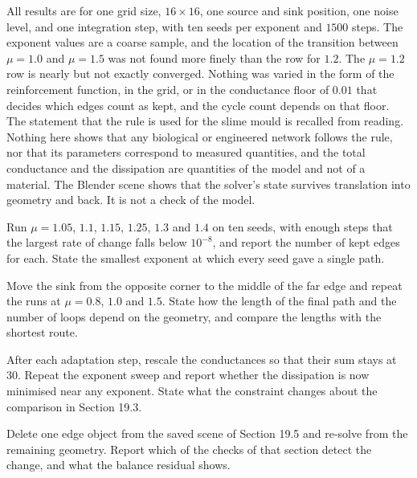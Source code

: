 All results are for one grid size, $16\times16$, one source and sink position, one noise level, and one integration step, with ten seeds per exponent and $1500$ steps. The exponent values are a coarse sample, and the location of the transition between $\mu=1.0$ and $\mu=1.5$ was not found more finely than the row for $1.2$. The $\mu=1.2$ row is nearly but not exactly converged. Nothing was varied in the form of the reinforcement function, in the grid, or in the conductance floor of $0.01$ that decides which edges count as kept, and the cycle count depends on that floor. The statement that the rule is used for the slime mould is recalled from reading. Nothing here shows that any biological or engineered network follows the rule, nor that its parameters correspond to measured quantities, and the total conductance and the dissipation are quantities of the model and not of a material. The Blender scene shows that the solver's state survives translation into geometry and back. It is not a check of the model.

\begin{exercise}
Run $\mu=1.05$, $1.1$, $1.15$, $1.25$, $1.3$ and $1.4$ on ten seeds, with enough steps that the largest rate of change falls below $10^{-8}$, and report the number of kept edges for each. State the smallest exponent at which every seed gave a single path.
\end{exercise}

\begin{exercise}
Move the sink from the opposite corner to the middle of the far edge and repeat the runs at $\mu=0.8$, $1.0$ and $1.5$. State how the length of the final path and the number of loops depend on the geometry, and compare the lengths with the shortest route.
\end{exercise}

\begin{exercise}[19.3: A budget]
After each adaptation step, rescale the conductances so that their sum stays at $30$. Repeat the exponent sweep and report whether the dissipation is now minimised near any exponent. State what the constraint changes about the comparison in Section 19.3.
\end{exercise}

\begin{exercise}
Delete one edge object from the saved scene of Section 19.5 and re-solve from the remaining geometry. Report which of the checks of that section detect the change, and what the balance residual shows.
\end{exercise}
